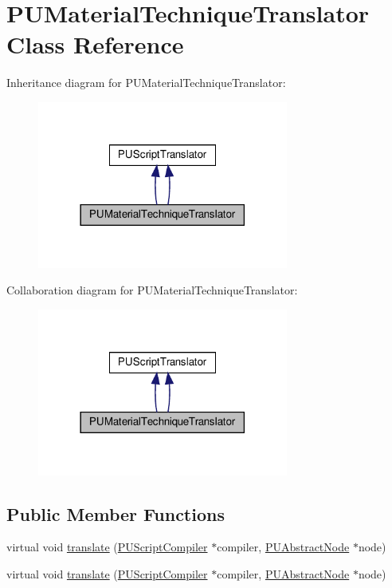 \hypertarget{classPUMaterialTechniqueTranslator}{}\section{P\+U\+Material\+Technique\+Translator Class Reference}
\label{classPUMaterialTechniqueTranslator}


Inheritance diagram for P\+U\+Material\+Technique\+Translator\+:
\nopagebreak
\begin{figure}[H]
\begin{center}
\leavevmode
\includegraphics[width=234pt]{classPUMaterialTechniqueTranslator__inherit__graph}
\end{center}
\end{figure}


Collaboration diagram for P\+U\+Material\+Technique\+Translator\+:
\nopagebreak
\begin{figure}[H]
\begin{center}
\leavevmode
\includegraphics[width=234pt]{classPUMaterialTechniqueTranslator__coll__graph}
\end{center}
\end{figure}
\subsection*{Public Member Functions}
\begin{DoxyCompactItemize}
\item 
virtual void \hyperlink{classPUMaterialTechniqueTranslator_aef390e290eec8a53e8d5e4d7ff38c21e}{translate} (\hyperlink{classPUScriptCompiler}{P\+U\+Script\+Compiler} $\ast$compiler, \hyperlink{classPUAbstractNode}{P\+U\+Abstract\+Node} $\ast$node)
\item 
virtual void \hyperlink{classPUMaterialTechniqueTranslator_ad104280e70098856848f9383b4c6274d}{translate} (\hyperlink{classPUScriptCompiler}{P\+U\+Script\+Compiler} $\ast$compiler, \hyperlink{classPUAbstractNode}{P\+U\+Abstract\+Node} $\ast$node)
\end{DoxyCompactItemize}
